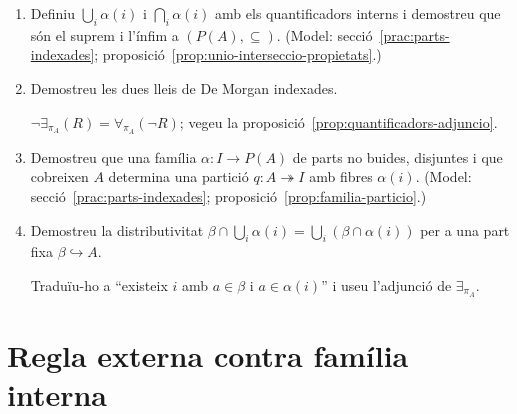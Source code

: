 \begin{enumerate}[resume]
  \item Definiu \(\bigcup_i\alpha(i)\) i \(\bigcap_i\alpha(i)\) amb els quantificadors interns i demostreu que són el suprem i l'ínfim a \((P(A),\subseteq)\). (Model: secció~\ref{prac:parts-indexades}; proposició~\ref{prop:unio-interseccio-propietats}.)

  \item Demostreu les dues lleis de De Morgan indexades. \begin{indicacio}\(\neg\exists_{\pi_A}(R)=\forall_{\pi_A}(\neg R)\); vegeu la proposició~\ref{prop:quantificadors-adjuncio}.\end{indicacio}

  \item Demostreu que una família \(\alpha\colon I\to P(A)\) de parts no buides, disjuntes i que cobreixen \(A\) determina una partició \(q\colon A\twoheadrightarrow I\) amb fibres \(\alpha(i)\). (Model: secció~\ref{prac:parts-indexades}; proposició~\ref{prop:familia-particio}.)

  \item Demostreu la distributivitat \(\beta\cap\bigcup_i\alpha(i)=\bigcup_i(\beta\cap\alpha(i))\) per a una part fixa \(\beta\hookrightarrow A\). \begin{indicacio}Traduïu-ho a \enquote{existeix \(i\) amb \(a\in\beta\) i \(a\in\alpha(i)\)} i useu l'adjunció de \(\exists_{\pi_A}\).\end{indicacio}
\end{enumerate}

\section{Regla externa contra família interna}


